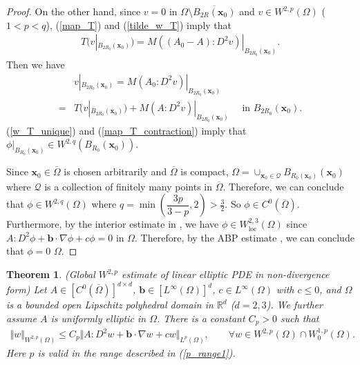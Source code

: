 \documentclass[12pt]{amsart}
\newcommand{\boldx}{\boldsymbol{x}}
\newtheorem{theorem}{Theorem}[section]
\theoremstyle{definition}
\theoremstyle{remark}
\begin{document}
\begin{proof}
On the other hand, since $v = 0$ in $\Omega \setminus \overline{B_{2R}(\boldx_{0})}$ 
and $v \in W^{2,p}(\Omega)$ ($1< p < q$), (\ref{map_T}) and (\ref{tilde_w_T}) imply that 
\begin{align*}
T (v|_{B_{2R_{0}}(\boldx_{0})}) = M\left( (A_{0} - A):D^{2} v \right)|_{B_{2R_{0}}(\boldx_{0})}.
\end{align*}
Then we have 
\begin{align}
\label{map_T_contraction}
& v|_{B_{2R_{0}}(\boldx_{0})} = M(A_{0}:D^{2}v)|_{B_{2R_{0}}(\boldx_{0})} \\ 
\nonumber 
= & T (v|_{B_{2R_{0}}(\boldx_{0})}) + M\left( A:D^{2} v \right)|_{B_{2R_{0}}(\boldx_{0})} 
\quad \text{ in } B_{2R_{0}}(\boldx_{0}).
\end{align} 
(\ref{w_T_unique}) and (\ref{map_T_contraction}) imply that $\phi |_{B_{R_{0}}(\boldx_{0})} 
\in W^{2,q}(B_{R_{0}}(\boldx_{0}))$. 

Since $\boldx_{0} \in \overline{\Omega}$ is chosen arbitrarily and $\overline{\Omega}$ is compact,  
$\Omega = \cup_{\boldx_{0}\in \mathcal{Q}}B_{R_{0}(\boldx_{0})}(\boldx_{0})$ where $\mathcal{Q}$ is 
a collection of finitely many points in $\overline{\Omega}$.
Therefore, we can conclude that $\phi \in W^{2,q}(\Omega)$ 
where $q = \min (\dfrac{3p}{3 - p} ,2) > \frac{3}{2}$. So $\phi \in C^{0}(\overline{\Omega})$. Furthermore, by the interior estimate in 
\cite[Lemma~$9.16$]{GT01}, we have $\phi \in W_{\text{loc}}^{2,3}(\Omega)$ since 
$A:D^{2} \phi + \boldsymbol{b}\cdot \nabla \phi + c \phi = 0$ in $\Omega$.
Therefore, by the ABP estimate \cite[Theorem~$9.1$]{GT01}, we can conclude 
that $\phi = 0$  $\Omega$.
\end{proof}

\begin{theorem}
\label{thm_global_A_continuous}
(Global $W^{2,p}$ estimate of linear elliptic PDE in non-divergence form)
Let $A \in [C^{0}(\overline{\Omega})]^{d\times d}$, $\boldsymbol{b}\in 
[L^{\infty}(\Omega)]^{d}$, $c \in L^{\infty}(\Omega)$ with $c \leq 0$, 
 and $\Omega$ is a bounded open Lipschitz polyhedral domain 
in $\mathbb{R}^{d}$ ($d=2,3$).  We further assume $A$ is uniformly elliptic in $\Omega$.
 There is a constant $C_{p}>0$ such that 
\begin{align}
\label{global_w2p_estimate_A_continuous}
\Vert w\Vert_{W^{2,p}(\Omega)} \leq C_{p} \Vert A:D^{2}w  + \boldsymbol{b}\cdot 
\nabla w + c w\Vert_{L^{p}(\Omega)}, 
\qquad \forall w \in W^{2,p}(\Omega) \cap W_{0}^{1,p}(\Omega).
\end{align}
Here $p$ is valid in the range described in (\ref{p_range1}).
\end{theorem}
\end{document}
